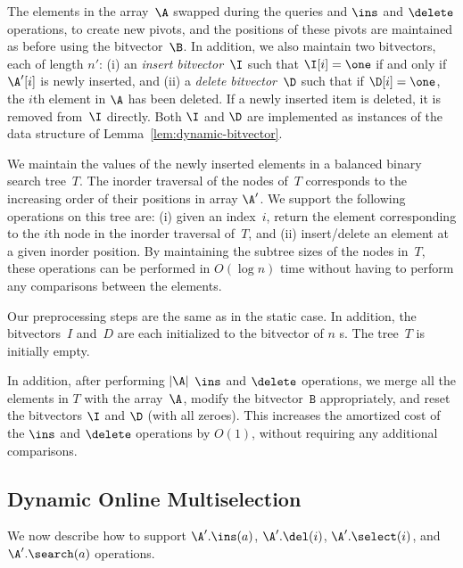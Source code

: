 The elements in the array~$\A$ swapped during the queries and $\ins$ and $\delete$ operations,
to create new pivots, and the positions of these pivots are maintained
as before using the bitvector~$\B$. In addition, we also maintain two  
bitvectors, each of length $n'$: (i) an \emph{insert bitvector}~$\I$ such 
that $\I[i] = \one$ if and only if $\A'[i]$ is newly inserted, and (ii) a 
\emph{delete bitvector}~$\D$ such that if $\D[i] = \one$, the $i$th 
element in $\A$ has been deleted. If a newly inserted item is deleted, 
it is removed from~$\I$ directly. Both $\I$ and $\D$ are implemented 
as instances of the data structure of Lemma~\ref{lem:dynamic-bitvector}.

We maintain the values of the newly inserted elements in a balanced binary search tree~$T$. The  inorder traversal of the nodes of~$T$ corresponds to the increasing order of their positions in array $\A'$. 
We support the following operations on this tree are: (i) given an index~$i$, return the element corresponding to the $i$th node in the inorder traversal of~$T$,
and (ii) insert/delete an element at a given inorder position.
By maintaining the subtree sizes of the nodes in~$T$, these operations
 can be performed in $O(\log n)$ time 
without having to perform any comparisons between the elements.

Our preprocessing steps are the same as in the static case. In addition, the bitvectors~$I$ 
and~$D$ are each initialized to the bitvector of $n$ \zero s. The tree~$T$ is initially empty.

In addition, after performing $|\A|$ $\ins$ and $\delete$ operations, we merge all the elements 
in $T$ with the array~$\A$, modify the bitvector~$\texttt{B}$ appropriately, and 
reset the bitvectors $\I$ and $\D$ (with all zeroes). This increases the 
amortized cost of the $\ins$ and $\delete$ operations by $O(1)$, without requiring any additional
comparisons.

\subsection{Dynamic Online Multiselection}
\label{subsec:internal-dynamic}

We now describe how to support $\A'.\ins(a)$, $\A'.\del(i)$, $\A'.\select(i)$, and $\A'.\search(a)$ 
operations.


